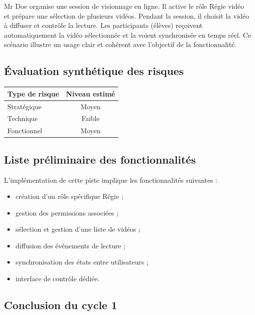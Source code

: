 \documentclass[12pt,a4paper]{report}
\begin{document}
Mr Doe organise une session de visionnage en ligne.
Il active le rôle \og Régie vidéo \fg{} et prépare une sélection de plusieurs vidéos.
Pendant la session, il choisit la vidéo à diffuser et contrôle la lecture.
Les participants (élèves) reçoivent automatiquement la vidéo sélectionnée et la voient
synchronisée en temps réel.
Ce scénario illustre un usage clair et cohérent avec l’objectif de la fonctionnalité.

\subsection{Évaluation synthétique des risques}

\begin{center}
\begin{tabular}{|l|c|}
\hline
\textbf{Type de risque} & \textbf{Niveau estimé} \\
\hline
Stratégique & Moyen \\
Technique & Faible \\
Fonctionnel & Moyen \\
\hline
\end{tabular}
\end{center}

\subsection{Liste préliminaire des fonctionnalités}

L’implémentation de cette piste implique les fonctionnalités suivantes :
\begin{itemize}
  \item création d’un rôle spécifique \og Régie \fg{} ;
  \item gestion des permissions associées ;
  \item sélection et gestion d’une liste de vidéos ;
  \item diffusion des événements de lecture ;
  \item synchronisation des états entre utilisateurs ;
  \item interface de contrôle dédiée.
\end{itemize}

\subsection{Conclusion du cycle 1}
\end{document}
